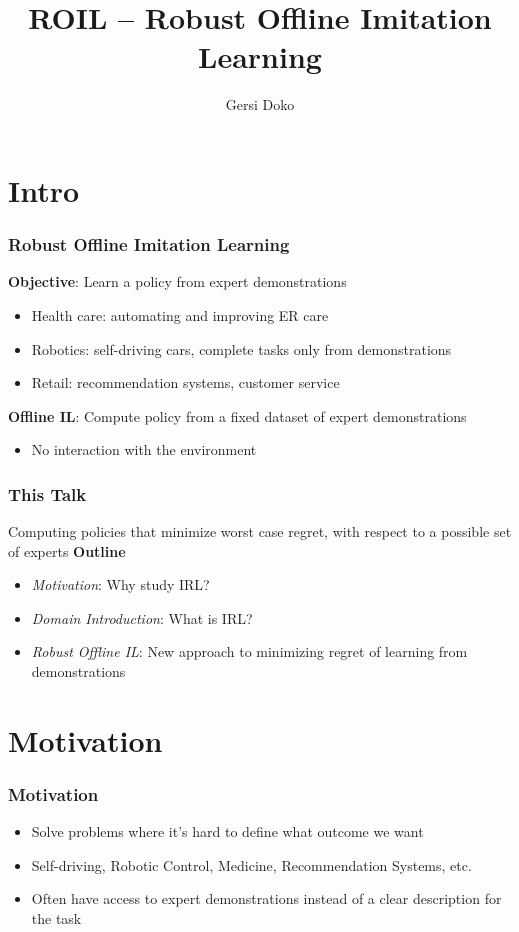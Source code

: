 \documentclass{beamer}
\title{ROIL -- Robust Offline Imitation Learning}
\author{Gersi Doko}
\institute{Department of Computer Science \\ University of New Hampshire}
\begin{document}
\frame{\titlepage}

\section*{Intro}

\begin{frame}
	\frametitle{Robust Offline Imitation Learning}
	\textbf{Objective}: Learn a policy from expert demonstrations
	\begin{itemize}
	\item Health care: automating and improving ER care
	\item Robotics: self-driving cars, complete tasks only from demonstrations
	\item Retail: recommendation systems, customer service
	
	\end{itemize}
	\vfill
	\textbf{Offline IL}: Compute policy from a fixed dataset of expert demonstrations
	\begin{itemize}
		\item No interaction with the environment
	\end{itemize}
\end{frame}

\begin{frame}
	\frametitle{This Talk}
	Computing policies that minimize worst case regret, with respect to a possible set of experts
	\vfill
	\textbf{Outline}
	\begin{itemize}
	\item \emph{Motivation}: Why study IRL?
	\item \emph{Domain Introduction}: What is IRL?
	\item \emph{Robust Offline IL}: New approach to minimizing regret of learning from demonstrations
	\end{itemize}
\end{frame}

\section*{Motivation}

\begin{frame}
\frametitle{Motivation}
	\begin{itemize}
		\item Solve problems where it's hard to define what outcome we want
		\item Self-driving, Robotic Control, Medicine, Recommendation Systems, etc.
		\item Often have access to expert demonstrations instead of a clear description for the task
	\end{itemize}
\end{frame}
\end{document}
